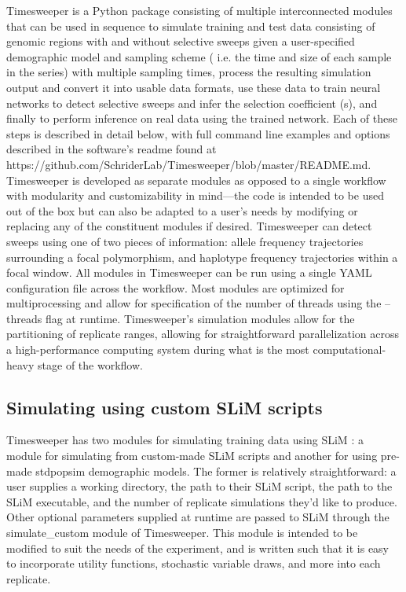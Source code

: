 Timesweeper is a Python package consisting of multiple interconnected modules that can be used in sequence to simulate training and test data consisting of genomic regions with and without selective sweeps given a user-specified demographic model and sampling scheme ( i.e. the time and size of each sample in the series) with multiple sampling times, process the resulting simulation output and convert it into usable data formats, use these data to train neural networks to detect selective sweeps and infer the selection coefficient (s), and finally to perform inference on real data using the trained network. Each of these steps is described in detail below, with full command line examples and options described in the software’s readme found at https://github.com/SchriderLab/Timesweeper/blob/master/README.md. Timesweeper is developed as separate modules as opposed to a single workflow with modularity and customizability in mind—the code is intended to be used out of the box but can also be adapted to a user’s needs by modifying or replacing any of the constituent modules if desired. Timesweeper can detect sweeps using one of two pieces of information: allele frequency trajectories surrounding a focal polymorphism, and haplotype frequency trajectories within a focal window. All modules in Timesweeper can be run using a single YAML configuration file across the workflow. Most modules are optimized for multiprocessing and allow for specification of the number of threads using the --threads flag at runtime. Timesweeper’s simulation modules allow for the partitioning of replicate ranges, allowing for straightforward parallelization across a high-performance computing system during what is the most computational-heavy stage of the workflow. \\

\subsection{Simulating using custom SLiM scripts}

Timesweeper has two modules for simulating training data using SLiM \cite{hallerSLiMForwardGenetic2019}: a module for simulating from custom-made SLiM scripts and another for using pre-made stdpopsim \cite{adrionCommunitymaintainedStandardLibrary2020} demographic models. The former is relatively straightforward: a user supplies a working directory, the path to their SLiM script, the path to the SLiM executable, and the number of replicate simulations they’d like to produce. Other optional parameters supplied at runtime are passed to SLiM through the simulate\_custom module of Timesweeper. This module is intended to be modified to suit the needs of the experiment, and is written such that it is easy to incorporate utility functions, stochastic variable draws, and more into each replicate. 

